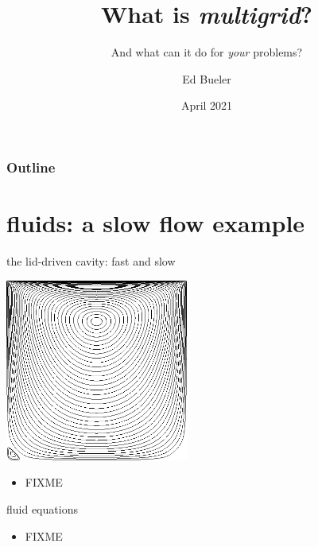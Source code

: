 \documentclass[10pt,hyperref,dvipsnames]{beamer}
\title{What is \emph{multigrid}?}
\subtitle{And what can it do for \emph{your} problems?}
\author{Ed Bueler}
\institute[UAF]{University of Alaska Fairbanks}
\date{April 2021}
\begin{document}
\beamertemplatenavigationsymbolsempty

\begin{frame}
  \maketitle
\end{frame}

\begin{frame}
  \frametitle{Outline}
  \tableofcontents[hideallsubsections]
\end{frame}


\section{fluids: a slow flow example}

\begin{frame}{the lid-driven cavity: fast and slow}

\begin{center}
\includegraphics[width=0.45\textwidth]{figs/eddies1.png}
\end{center}

\begin{itemize}
\item FIXME
\end{itemize}
\end{frame}


\begin{frame}{fluid equations}

\begin{itemize}
\item FIXME
\end{itemize}
\end{frame}
\end{document}

